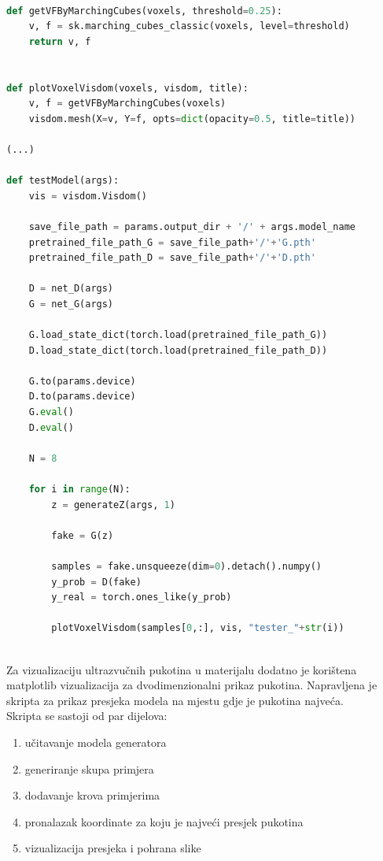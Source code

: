 \documentclass[times, utf8, diplomski]{fer}
\begin{document}
\begin{lstlisting}[language=Python, caption=Kod za vizualizaciju pomoću alata Visdom]

def getVFByMarchingCubes(voxels, threshold=0.25):
    v, f = sk.marching_cubes_classic(voxels, level=threshold)
    return v, f


def plotVoxelVisdom(voxels, visdom, title):
    v, f = getVFByMarchingCubes(voxels)
    visdom.mesh(X=v, Y=f, opts=dict(opacity=0.5, title=title))
    
(...)

def testModel(args):
    vis = visdom.Visdom()
    
    save_file_path = params.output_dir + '/' + args.model_name
    pretrained_file_path_G = save_file_path+'/'+'G.pth'
    pretrained_file_path_D = save_file_path+'/'+'D.pth'
    
    D = net_D(args)
    G = net_G(args)
    
    G.load_state_dict(torch.load(pretrained_file_path_G))
    D.load_state_dict(torch.load(pretrained_file_path_D))
    
    G.to(params.device)
    D.to(params.device)
    G.eval()
    D.eval()
    
    N = 8
    
    for i in range(N):
        z = generateZ(args, 1)
    
        fake = G(z)
        
        samples = fake.unsqueeze(dim=0).detach().numpy()
        y_prob = D(fake)
        y_real = torch.ones_like(y_prob)
    
        plotVoxelVisdom(samples[0,:], vis, "tester_"+str(i))
    

\end{lstlisting}

\break

Za vizualizaciju ultrazvučnih pukotina u materijalu dodatno je korištena matplotlib vizualizacija za dvodimenzionalni prikaz pukotina. Napravljena je skripta za prikaz presjeka modela na mjestu gdje je pukotina najveća.\\
Skripta se sastoji od par dijelova:
\begin{enumerate}
    \item učitavanje modela generatora
    \item generiranje skupa primjera
    \item dodavanje krova primjerima
    \item pronalazak koordinate za koju je najveći presjek pukotina
    \item vizualizacija presjeka i pohrana slike
\end{enumerate}
\end{document}
